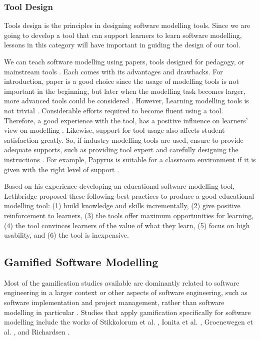 \documentclass[12pt, a4paper]{report}
\begin{document}
{\subsubsection{Tool Design}
Tools design is the principles in designing software modelling tools. Since we are going to develop a tool that can support learners to learn software modelling, lessons in this category will have important in guiding the design of our tool. 

We can teach software modelling using papers, tools designed for pedagogy, or mainstream tools \cite{Akayama2013}. Each comes with its advantages and drawbacks. For introduction, paper is a good choice since the usage of modelling tools is not important in the beginning, but later when the modelling task becomes larger, more advanced tools could be considered \cite{bezivin2009teaching}. However, Learning modelling tools is not trivial \cite{paige2014bad}. Considerable efforts required to become fluent using a tool. Therefore, a good experience with the tool, has a positive inﬂuence on learners' view on modelling \cite{liebel2015ready}. Likewise, support for tool usage also affects student satisfaction greatly. So, if industry modelling tools are used, ensure to provide adequate supports, such as providing tool expert and carefully designing the instructions \cite{liebel2015ready}. For example, Papyrus is suitable for a classroom environment if it is given with the right level of support \cite{liebel2015ready}.

Based on his experience developing an educational software modelling tool, Lethbridge \cite{lethbridge2014teaching} proposed these following best practices to produce  a good educational modelling tool: (1) build knowledge and skills incrementally, (2) give positive reinforcement to learners, (3) the tools offer maximum opportunities for learning, (4) the tool convinces learners of the value of what they learn, (5) focus on high usability, and (6) the tool is inexpensive.

\subsection{Gamified Software Modelling}
Most of the gamification studies available are dominantly related to software engineering in a larger context or other aspects of software engineering, such as software implementation and project management, rather than software modelling in particular \cite{Pedreira2015}. Studies that apply gamification specifically for software modelling include the works of Stikkolorum et al. \cite{Stikkolorum2014}, Ionita et al. \cite{Ionita2015}, Groenewegen et al. \cite{Groenewegen2010}, and Richardsen \cite{Richardsen2014}. 

}
\end{document}
